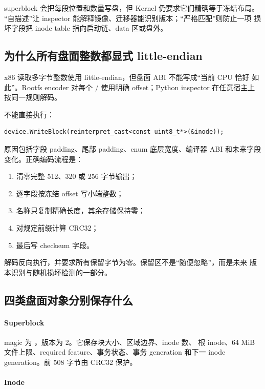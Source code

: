 superblock 会把每段位置和数量写盘，但 Kernel 仍要求它们精确等于冻结布局。
“自描述”让 inspector 能解释镜像、迁移器能识别版本；“严格匹配”则防止一项
损坏字段把 inode table 指向启动链、data 区或盘外。

\subsection{为什么所有盘面整数都显式 little-endian}

x86 读取多字节整数使用 little-endian，但盘面 ABI 不能写成“当前 CPU 恰好
如此”。Rootfs encoder 对每个 / 使用明确
offset；Python inspector 在任意宿主上按同一规则解码。

不能直接执行：

\begin{lstlisting}[caption={禁止把内存对象布局冒充盘面格式}]
device.WriteBlock(reinterpret_cast<const uint8_t*>(&inode));
\end{lstlisting}

原因包括字段 padding、尾部 padding、enum 底层宽度、编译器 ABI 和未来字段
变化。正确编码流程是：

\begin{enumerate}
  \item 清零完整 512、320 或 256 字节输出；
  \item 逐字段按冻结 offset 写小端整数；
  \item 名称只复制精确长度，其余存储保持零；
  \item 对规定前缀计算 CRC32；
  \item 最后写 checksum 字段。
\end{enumerate}

解码反向执行，并要求所有保留字节为零。保留区不是“随便忽略”，而是未来
版本识别与随机损坏检测的一部分。

\subsection{四类盘面对象分别保存什么}

\paragraph{Superblock}

magic 为 ，版本为 2。它保存块大小、区域边界、inode 数、
根 inode、64 MiB 文件上限、required feature、事务状态、事务 generation
和下一 inode generation。前 508 字节由 CRC32 保护。

\paragraph{Inode}

